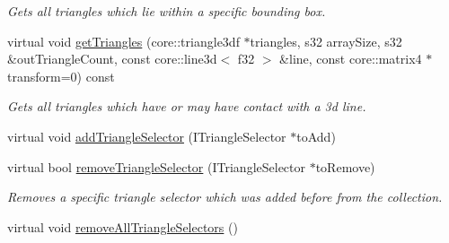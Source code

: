 \begin{DoxyCompactItemize}
\begin{DoxyCompactList}\small\item\em Gets all triangles which lie within a specific bounding box. \end{DoxyCompactList}\item 
\hypertarget{classirr_1_1scene_1_1_c_meta_triangle_selector_aeddba489dfa6ef55953d8499df426580}{virtual void \hyperlink{classirr_1_1scene_1_1_c_meta_triangle_selector_aeddba489dfa6ef55953d8499df426580}{get\-Triangles} (core\-::triangle3df $\ast$triangles, s32 array\-Size, s32 \&out\-Triangle\-Count, const core\-::line3d$<$ f32 $>$ \&line, const core\-::matrix4 $\ast$transform=0) const }\label{classirr_1_1scene_1_1_c_meta_triangle_selector_aeddba489dfa6ef55953d8499df426580}

\begin{DoxyCompactList}\small\item\em Gets all triangles which have or may have contact with a 3d line. \end{DoxyCompactList}\item 
virtual void \hyperlink{classirr_1_1scene_1_1_c_meta_triangle_selector_a66f0a75fb1c4d98985bf6c6f4fef0bd8}{add\-Triangle\-Selector} (I\-Triangle\-Selector $\ast$to\-Add)
\item 
\hypertarget{classirr_1_1scene_1_1_c_meta_triangle_selector_a2759dae85865ed64ad58ad0789565f4c}{virtual bool \hyperlink{classirr_1_1scene_1_1_c_meta_triangle_selector_a2759dae85865ed64ad58ad0789565f4c}{remove\-Triangle\-Selector} (I\-Triangle\-Selector $\ast$to\-Remove)}\label{classirr_1_1scene_1_1_c_meta_triangle_selector_a2759dae85865ed64ad58ad0789565f4c}

\begin{DoxyCompactList}\small\item\em Removes a specific triangle selector which was added before from the collection. \end{DoxyCompactList}\item 
\hypertarget{classirr_1_1scene_1_1_c_meta_triangle_selector_ac28bab23d5d522f78376e55e256a81d5}{virtual void \hyperlink{classirr_1_1scene_1_1_c_meta_triangle_selector_ac28bab23d5d522f78376e55e256a81d5}{remove\-All\-Triangle\-Selectors} ()}\label{classirr_1_1scene_1_1_c_meta_triangle_selector_ac28bab23d5d522f78376e55e256a81d5}


\end{DoxyCompactItemize}
